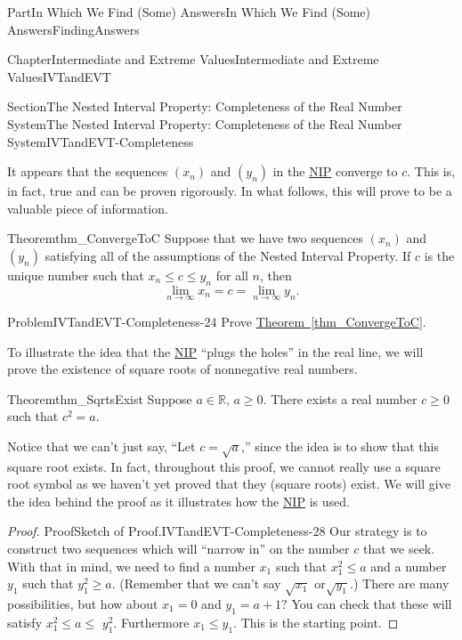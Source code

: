 \documentclass[oneside,10pt,]{book}
\newcommand{\xreffont}{\relax}
\numberwithin{equation}{part}
\def\limit#1#2#3{{\displaystyle\lim_{#1\rightarrow #2}#3}}
\begin{document}
\begin{partptx}{Part}{In Which We Find (Some) Answers}{}{In Which We Find (Some) Answers}{}{}{FindingAnswers}
\begin{chapterptx}{Chapter}{Intermediate and Extreme Values}{}{Intermediate and Extreme Values}{}{}{IVTandEVT}
\begin{sectionptx}{Section}{The Nested Interval Property: Completeness of the Real Number System}{}{The Nested Interval Property: Completeness of the Real Number System}{}{}{IVTandEVT-Completeness}
\par
It appears that the sequences \(\left(x_n\right)\) and \(\left(y_n\right)\) in the \hyperref[NIP]{NIP}  converge to \(c\). This is, in fact, true and can be proven rigorously. In what follows, this will prove to be a valuable piece of information.%
\begin{theorem}{Theorem}{}{}{thm_ConvergeToC}%
 Suppose that we have two sequences \(\left(x_n\right)\) and \(\left(y_n\right)\) satisfying all of the assumptions of the Nested Interval Property.  If \(c\) is the unique number such that \(x_n\leq c\leq y_n\) for all \(n\), then%
\begin{equation*}
\limit{n}{\infty}{x_n}=c =
\limit{n}{\infty}{y_n}\text{.}
\end{equation*}
%
\end{theorem}
\begin{problem}{Problem}{}{IVTandEVT-Completeness-24}%
 Prove \hyperref[thm_ConvergeToC]{Theorem~{\xreffont\ref{thm_ConvergeToC}}}.%
\end{problem}
To illustrate the idea that the \hyperref[NIP]{NIP}  ``plugs the holes'' in the real line, we will prove the existence of square roots of nonnegative real numbers.%
\begin{theorem}{Theorem}{}{}{thm_SqrtsExist}%
%
Suppose \(a\in\mathbb{R},\,a\geq 0\).  There exists a real number \(c\geq 0\) such that \(c^2=a\).%
\end{theorem}
Notice that we can't just say, ``Let \(c=\sqrt{a}\),'' since the idea is to show that this square root exists.  In fact, throughout this proof, we cannot really use a square root symbol as we haven't yet proved that they (square roots) exist. We will give the idea behind the proof as it illustrates how the \hyperref[NIP]{NIP}  is used.%
\begin{proof}{Proof}{Sketch of Proof.}{IVTandEVT-Completeness-28}
Our strategy is to construct two sequences which will ``narrow in'' on the number \(c\) that we seek.  With that in mind, we need to find a number \(x_1\) such that \(x_1^2\leq a\) and a number \(y_1\) such that \(y_1^2\geq a\).  (Remember that we can't say \(\sqrt{x_1}\) or\(\sqrt{y_1}\).)  There are many possibilities, but how about \(x_1=0\) and \(y_1=a+1?\) You can check that these will satisfy \(x_1^2\leq a\leq\) \(y_1^2\).  Furthermore \(x_1\leq y_1\).  This is the starting point.%
\par

\end{proof}
\end{sectionptx}
\end{chapterptx}
\end{partptx}
\end{document}
